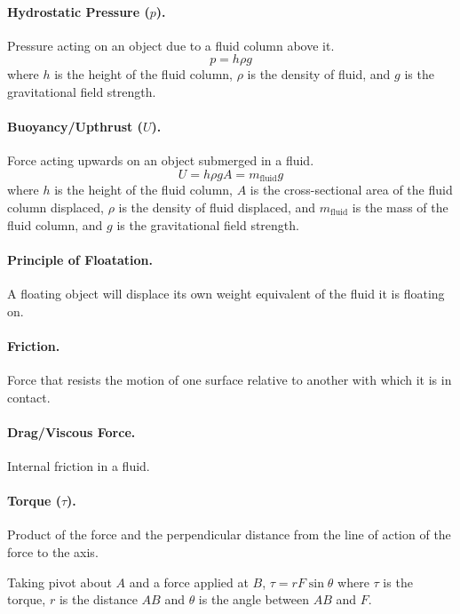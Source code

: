 \documentclass{article}
\begin{document}
\paragraph{Hydrostatic Pressure ($p$).} Pressure acting on an object due to a fluid column above it. \begin{equation}
p = h \rho g
\end{equation} where $h$ is the height of the fluid column, $\rho$ is the density of fluid, and $g$ is the gravitational field strength.

\paragraph{Buoyancy/Upthrust ($U$).} Force acting upwards on an object submerged in a fluid. \begin{equation}
U = h \rho gA = m_\text{fluid}g
\end{equation} where $h$ is the height of the fluid column, $A$ is the cross-sectional area of the fluid column displaced, $\rho$ is the density of fluid displaced, and $m_\text{fluid}$ is the mass of the fluid column, and $g$ is the gravitational field strength.

\paragraph{Principle of Floatation.} A floating object will displace its own weight equivalent of the fluid it is floating on.

\paragraph{Friction.} Force that resists the motion of one surface relative to another with which it is in contact.

\paragraph{Drag/Viscous Force.} Internal friction in a fluid.

\paragraph{Torque ($\tau$).} Product of the force and the perpendicular distance from the line of action of the force to the axis.

Taking pivot about $A$ and a force applied at $B$, $\tau = rF\sin\theta$ where $\tau$ is the torque, $r$ is the distance $AB$ and $\theta$ is the angle between $AB$ and $F$.
\end{document}
